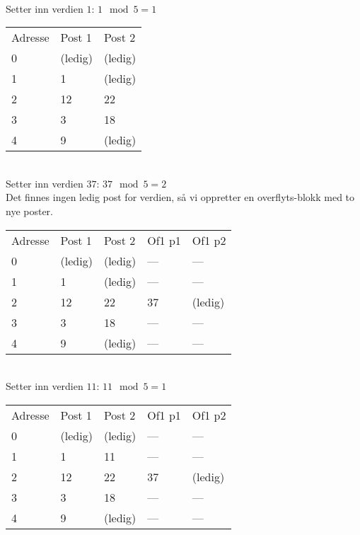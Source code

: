 \documentclass[a4paper, 12pt] {article}
\begin{document}
~\\
Setter inn verdien $1$: $1 \mod 5 = 1$\\
\begin{tabular}{|l|l|l|}
    \hline
    Adresse & Post 1 & Post 2 \\
    0       & (ledig)& (ledig)\\
    1       & 1      & (ledig)\\
    2       & 12     & 22     \\
    3       & 3      & 18     \\
    4       & 9      & (ledig)\\ \hline
\end{tabular}

~\\
Setter inn verdien $37$: $37 \mod 5 = 2$\\
Det finnes ingen ledig post for verdien, så vi oppretter en overflyts-blokk med to nye poster.\\
\begin{tabular}{|l|l|l|l|l|}
    \hline
    Adresse & Post 1 & Post 2 & Of1 p1 & Of1 p2 \\
    0       & (ledig)& (ledig)& ---   & ---   \\
    1       & 1      & (ledig)& ---   & ---   \\
    2       & 12     & 22     & 37     & (ledig)\\
    3       & 3      & 18     & ---   & ---   \\
    4       & 9      & (ledig)& ---   & ---   \\ \hline
\end{tabular}

~\\
Setter inn verdien $11$: $11 \mod 5 = 1$\\
\begin{tabular}{|l|l|l|l|l|}
    \hline
    Adresse & Post 1 & Post 2 & Of1 p1 & Of1 p2 \\
    0       & (ledig)& (ledig)& ---   & ---   \\
    1       & 1      & 11     & ---   & ---   \\
    2       & 12     & 22     & 37     & (ledig)\\
    3       & 3      & 18     & ---   & ---   \\
    4       & 9      & (ledig)& ---   & ---   \\ \hline
\end{tabular}
\end{document}
